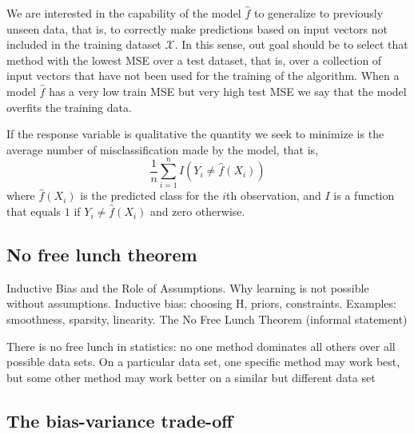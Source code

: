 We are interested in the capability of the model $\hat{f}$ to generalize to previously unseen data, that is, to correctly make predictions based on input vectors not included in the training dataset $\mathcal{X}$. In this sense, out goal should be to select that method with the lowest MSE over a test dataset, that is, over a collection of input vectors that have not been used for the training of the algorithm. When a model $\hat{f}$ has a very low train MSE but very high test MSE we say that the model overfits the training data.

If the response variable is qualitative the quantity we seek to minimize is the average number of misclassification made by the model, that is,
\[
    \frac{1}{n} \sum_{i=1}^n I \left( Y_i \neq \hat{f}(X_i) \right)
\]
where $\hat{f}(X_i)$ is the predicted class for the $i$th observation, and $I$ is a function that equals $1$ if $Y_i \neq \hat{f}(X_i)$ and zero otherwise.

\subsection{No free lunch theorem}

{\color{red} Inductive Bias and the Role of Assumptions. Why learning is not possible without assumptions. Inductive bias: choosing H, priors, constraints. Examples: smoothness, sparsity, linearity. The No Free Lunch Theorem (informal statement)}

{\color{red} There is no free lunch in statistics: no one method dominates all others over all possible data sets. On a particular data set, one specific method may work best, but some other method may work better on a similar but different data set}


\subsection{The bias-variance trade-off}

